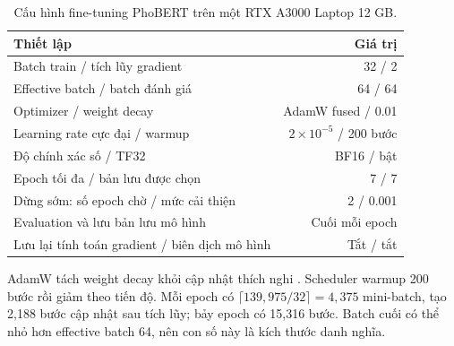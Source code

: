 \begin{table}[htbp]\centering\small\caption{Cấu hình fine-tuning PhoBERT trên một RTX A3000 Laptop 12 GB.}
\begin{tabular}{lr}\toprule Thiết lập & Giá trị\\\midrule
Batch train / tích lũy gradient & 32 / 2\\
Effective batch / batch đánh giá & 64 / 64\\
Optimizer / weight decay & AdamW fused / 0.01\\
Learning rate cực đại / warmup & $2\times10^{-5}$ / 200 bước\\
Độ chính xác số / TF32 & BF16 / bật\\
Epoch tối đa / bản lưu được chọn & 7 / 7\\
Dừng sớm: số epoch chờ / mức cải thiện & 2 / 0.001\\
Evaluation và lưu bản lưu mô hình & Cuối mỗi epoch\\
Lưu lại tính toán gradient / biên dịch mô hình & Tắt / tắt\\\bottomrule
\end{tabular}\end{table}
AdamW tách weight decay khỏi cập nhật thích nghi \citep{adamw}. Scheduler warmup 200 bước rồi giảm theo tiến độ. Mỗi epoch có $\lceil139{,}975/32\rceil=4{,}375$ mini-batch, tạo 2,188 bước cập nhật sau tích lũy; bảy epoch có 15,316 bước. Batch cuối có thể nhỏ hơn effective batch 64, nên con số này là kích thước danh nghĩa.

